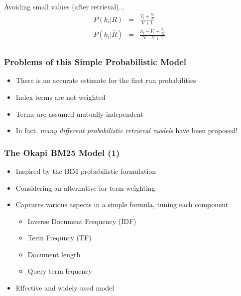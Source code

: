 \documentclass[svgnames]{beamer}
\begin{document}
\begin{frame}[allowframebreaks]
  \begin{block}{Avoiding small values (after retrieval)...}
    \begin{displaymath}
      \begin{array}{rcl}
        P(k_i|R) &=& \frac{V_i + \frac{n_i}{N}}{V + 1}\\
        P(k_i|\overline{R}) &=& \frac{n_i - V_i + \frac{n_i}{N}}{N - V + 1}\\
      \end{array}
    \end{displaymath}    
  \end{block}
\end{frame}


\begin{frame} \frametitle{Problems of this Simple Probabilistic Model}
  \begin{block}{}
    \begin{itemize}
    \item There is no accurate estimate for the first run probabilities
    \item Index terms are not weighted
    \item Terms are assumed mutually independent
    \end{itemize}
  \end{block}
  \begin{block}{}
    \begin{itemize}
    \item In fact, \emph{many different probabilistic retrieval models} have been proposed!
    \end{itemize}
  \end{block}
\end{frame}

\begin{frame} \frametitle{The Okapi BM25 Model (1)}
\begin{itemize}
\item Inspired by the BIM probabilistic formulation
\item Considering an alternative for term weighting
\item Captures various aspects in a simple formula, tuning each component
    \begin{itemize}
    \item Inverse Document Frequency (IDF)
    \item Term Frequncy (TF)
    \item Document length 
    \item Query term fequency
    \end{itemize}
\item Effective and widely used model
\end{itemize}
\end{frame}
\end{document}
